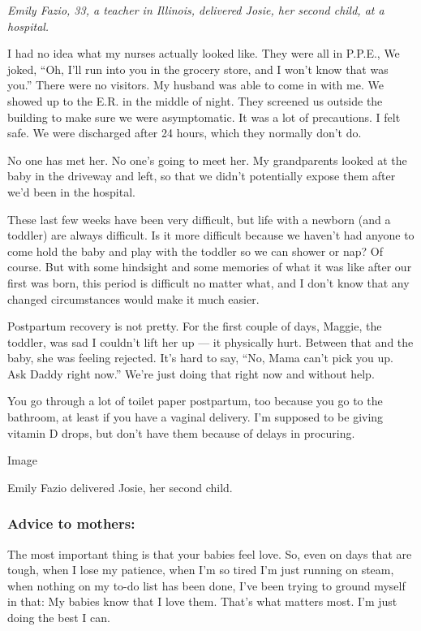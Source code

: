 \emph{Emily Fazio, 33, a teacher in Illinois, delivered Josie, her
second child, at a hospital.}

I had no idea what my nurses actually looked like. They were all in
P.P.E., We joked, ``Oh, I'll run into you in the grocery store, and I
won't know that was you.'' There were no visitors. My husband was able
to come in with me. We showed up to the E.R. in the middle of night.
They screened us outside the building to make sure we were asymptomatic.
It was a lot of precautions. I felt safe. We were discharged after 24
hours, which they normally don't do.

No one has met her. No one's going to meet her. My grandparents looked
at the baby in the driveway and left, so that we didn't potentially
expose them after we'd been in the hospital.

These last few weeks have been very difficult, but life with a newborn
(and a toddler) are always difficult. Is it more difficult because we
haven't had anyone to come hold the baby and play with the toddler so we
can shower or nap? Of course. But with some hindsight and some memories
of what it was like after our first was born, this period is difficult
no matter what, and I don't know that any changed circumstances would
make it much easier.

Postpartum recovery is not pretty. For the first couple of days, Maggie,
the toddler, was sad I couldn't lift her up --- it physically hurt.
Between that and the baby, she was feeling rejected. It's hard to say,
``No, Mama can't pick you up. Ask Daddy right now.'' We're just doing
that right now and without help.

You go through a lot of toilet paper postpartum, too because you go to
the bathroom, at least if you have a vaginal delivery. I'm supposed to
be giving vitamin D drops, but don't have them because of delays in
procuring.

Image

Emily Fazio delivered Josie, her second child.~

\hypertarget{advice-to-mothers-4}{%
\subsubsection{\texorpdfstring{\textbf{Advice to
mothers:}}{Advice to mothers:}}\label{advice-to-mothers-4}}

The most important thing is that your babies feel love. So, even on days
that are tough, when I lose my patience, when I'm so tired I'm just
running on steam, when nothing on my to-do list has been done, I've been
trying to ground myself in that: My babies know that I love them. That's
what matters most. I'm just doing the best I can.

